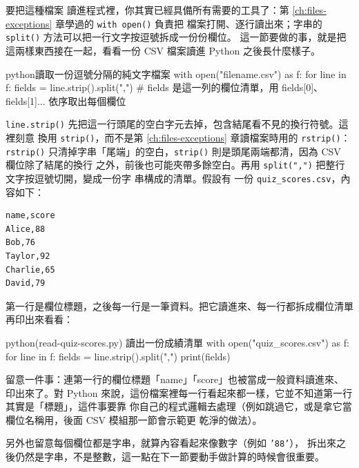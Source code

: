 要把這種檔案
讀進程式裡，你其實已經具備所有需要的工具了：第 \ref{ch:files-exceptions} 章學過的 \texttt{with open()} 負責把
檔案打開、逐行讀出來；字串的 \texttt{split()} 方法可以把一行文字按逗號拆成一份份欄位。
這一節要做的事，就是把這兩樣東西接在一起，看看一份 CSV 檔案讀進 Python 之後長什麼樣子。

\begin{code}{python}{讀取一份逗號分隔的純文字檔案}
with open("filename.csv") as f:
    for line in f:
        fields = line.strip().split(",")
        # fields 是這一列的欄位清單，用 fields[0]、fields[1]... 依序取出每個欄位
\end{code}

\texttt{line.strip()} 先把這一行頭尾的空白字元去掉，包含結尾看不見的換行符號。這裡刻意
換用 \texttt{strip()}，而不是第 \ref{ch:files-exceptions} 章讀檔案時用的 \texttt{rstrip()}：\texttt{rstrip()}
只清掉字串「尾端」的空白，\texttt{strip()} 則是頭尾兩端都清，因為 CSV 欄位除了結尾的換行
之外，前後也可能夾帶多餘空白。再用 \texttt{split(",")} 把整行文字按逗號切開，變成一份字
串構成的清單。假設有
一份 \texttt{quiz\_scores.csv}，內容如下：

\begin{verbatim}
name,score
Alice,88
Bob,76
Taylor,92
Charlie,65
David,79
\end{verbatim}

第一行是欄位標題，之後每一行是一筆資料。把它讀進來、每一行都拆成欄位清單再印出來看看：

\begin{example}{python}{(read-quiz-scores.py) 讀出一份成績清單}
with open("quiz_scores.csv") as f:
    for line in f:
        fields = line.strip().split(",")
        print(fields)
\end{example}


留意一件事：連第一行的欄位標題「name」「score」也被當成一般資料讀進來、印出來了。對
Python 來說，這份檔案裡每一行看起來都一樣，它並不知道第一行其實是「標題」，這件事要靠
你自己的程式邏輯去處理（例如跳過它，或是拿它當欄位名稱用，後面 CSV 模組那一節會示範更
乾淨的做法）。

另外也留意每個欄位都是字串，就算內容看起來像數字（例如 \texttt{'88'}），
拆出來之後仍然是字串，不是整數，這一點在下一節要動手做計算的時候會很重要。

